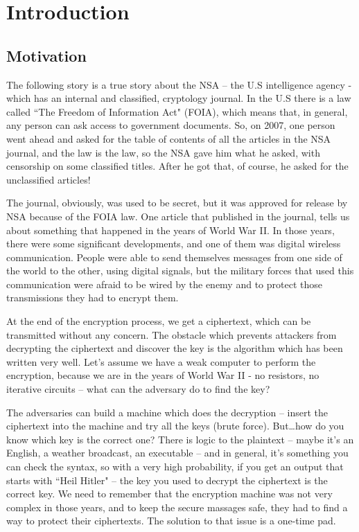 \chapter{Introduction} \label{chap:c1_IntroductionAOI}

\section{Motivation} \label{sec:Motivation} %

The following story is a true story about the NSA – the U.S intelligence agency
- which has an internal and classified, cryptology journal. In the U.S there is
a law called ``The Freedom of Information Act" (FOIA), which means that, in
general, any person can ask access to government documents. So, on 2007, one
person went ahead and asked for the table of contents of all the articles in the
NSA journal, and the law is the law, so the NSA gave him what he asked, with
censorship on some classified titles. After he got that, of course, he asked for
the unclassified articles!

The journal, obviously, was used to be secret, but it was approved for release
by NSA because of the FOIA law. One article that published in the journal, tells
us about something that happened in the years of World War II. In those years,
there were some significant developments, and one of them was digital wireless
communication. People were able to send themselves messages from one side of the
world to the other, using digital signals, but the military forces that used
this communication were afraid to be wired by the enemy and to protect those
transmissions they had to encrypt them. 

At the end of the encryption process, we get a ciphertext, which can be
transmitted without any concern. The obstacle which prevents attackers from
decrypting the ciphertext and discover the key is the algorithm which has been
written very well. Let's assume we have a weak computer to perform the
encryption, because we are in the years of World War II - no resistors, no
iterative circuits – what can the adversary do to find the key?

The adversaries can build a machine which does the decryption – insert the
ciphertext into the machine and try all the keys (brute force). But\ldots how do
you know which key is the correct one? There is logic to the plaintext – maybe
it's an English, a weather broadcast, an executable – and in general, it's
something you can check the syntax, so with a very high probability, if you get
an output that starts with ``Heil Hitler" – the key you used to decrypt the
ciphertext is the correct key. We need to remember that the encryption machine
was not very complex in those years, and to keep the secure massages safe, they
had to find a way to protect their ciphertexts. The solution to that issue is a
one-time pad.

